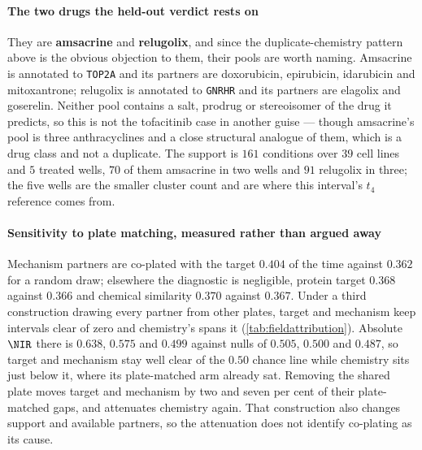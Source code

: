 \paragraph{The two drugs the held-out verdict rests on} They are
\textbf{amsacrine} and \textbf{relugolix}, and since the duplicate-chemistry
pattern above is the obvious objection to them, their pools are worth naming.
Amsacrine is annotated to \texttt{TOP2A} and its partners are doxorubicin,
epirubicin, idarubicin and mitoxantrone; relugolix is annotated to \texttt{GNRHR}
and its partners are elagolix and goserelin. Neither pool contains a salt,
prodrug or stereoisomer of the drug it predicts, so this is not the tofacitinib
case in another guise --- though amsacrine's pool is three anthracyclines and a
close structural analogue of them, which is a drug class and not a duplicate. The
support is $\num{161}$ conditions over $39$ cell lines and $5$ treated wells, $70$
of them amsacrine in two wells and $91$ relugolix in three; the five wells are the
smaller cluster count and are where this interval's $t_4$ reference comes
from.

\paragraph{Sensitivity to plate matching, measured rather than argued away}
Mechanism partners are co-plated with the target $0.404$ of the time against
$0.362$ for a random draw; elsewhere the diagnostic is negligible, protein target
$0.368$ against $0.366$ and chemical similarity $0.370$ against $0.367$. Under a
third construction drawing every partner from other plates, target and mechanism
keep intervals clear of zero and chemistry's spans it
(\cref{tab:fieldattribution}). Absolute $\NIR$ there is $0.638$, $0.575$ and
$0.499$ against nulls of $0.505$, $0.500$ and $0.487$, so target and mechanism
stay well clear of the $0.50$ chance line while chemistry sits just below it,
where its plate-matched arm already sat. Removing the shared plate moves target
and mechanism by two and seven per cent of their plate-matched gaps, and
attenuates chemistry again. That
construction also changes support and available partners, so the attenuation does
not identify co-plating as its cause.

